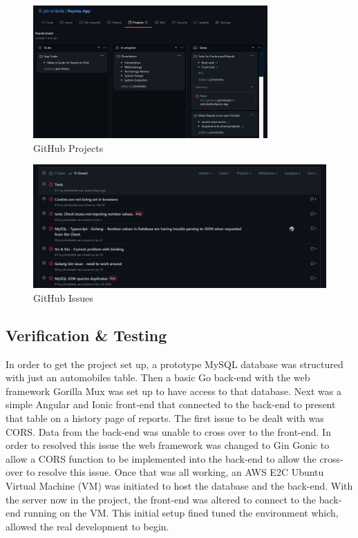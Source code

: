 \begin{figure}[!ht]
    \caption{GitHub Projects}
    \label{image:gitProjects}
    \centering
    \includegraphics[width=0.8\textwidth]{images/misc/git-projects.png}
\end{figure}

\begin{figure}[!ht]
    \caption{GitHub Issues}
    \label{image:gitIssues}
    \centering
    \includegraphics[width=0.8
    \textwidth]{images/misc/git-issues.png}
\end{figure}

\subsection{Verification \& Testing}
In order to get the project set up, a prototype MySQL database was structured with just an automobiles table. Then a basic Go back-end with the web framework Gorilla Mux was set up to have access to that database. Next was a simple Angular and Ionic front-end that connected to the back-end to present that table on a history page of reports. The first issue to be dealt with was CORS. Data from the back-end was unable to cross over to the front-end. In order to resolved this issue the web framework was changed to Gin Gonic to allow a CORS function to be implemented into the back-end to allow the cross-over to resolve this issue. Once that was all working, an AWS E2C Ubuntu Virtual Machine (VM) was initiated to host the database and the back-end. With the server now in the project, the front-end was altered to connect to the back-end running on the VM. This initial setup fined tuned the environment which, allowed the real development to begin. 

